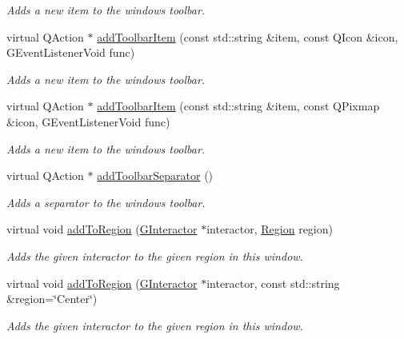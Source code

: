 \begin{DoxyCompactItemize}
\begin{DoxyCompactList}\small\item\em Adds a new item to the window\textquotesingle{}s toolbar. \end{DoxyCompactList}\item 
virtual Q\+Action $\ast$ \mbox{\hyperlink{classGWindow_a1cd26d8c9004f7cbd81cecfbd323f418}{add\+Toolbar\+Item}} (const std\+::string \&item, const Q\+Icon \&icon, G\+Event\+Listener\+Void func)
\begin{DoxyCompactList}\small\item\em Adds a new item to the window\textquotesingle{}s toolbar. \end{DoxyCompactList}\item 
virtual Q\+Action $\ast$ \mbox{\hyperlink{classGWindow_a6daacc5873dd3a11813a68fcf88c9d6e}{add\+Toolbar\+Item}} (const std\+::string \&item, const Q\+Pixmap \&icon, G\+Event\+Listener\+Void func)
\begin{DoxyCompactList}\small\item\em Adds a new item to the window\textquotesingle{}s toolbar. \end{DoxyCompactList}\item 
virtual Q\+Action $\ast$ \mbox{\hyperlink{classGWindow_a885470a4fc1b578a76f6fddc2b1950a2}{add\+Toolbar\+Separator}} ()
\begin{DoxyCompactList}\small\item\em Adds a separator to the window\textquotesingle{}s toolbar. \end{DoxyCompactList}\item 
virtual void \mbox{\hyperlink{classGWindow_aab55413917cdbb2e0560ab415d59fd1f}{add\+To\+Region}} (\mbox{\hyperlink{classGInteractor}{G\+Interactor}} $\ast$interactor, \mbox{\hyperlink{classGWindow_a81a01a86de31071a92e6cce0bab9bc4b}{Region}} region)
\begin{DoxyCompactList}\small\item\em Adds the given interactor to the given region in this window. \end{DoxyCompactList}\item 
virtual void \mbox{\hyperlink{classGWindow_a9c8e600889001e6e72d3548918a6baff}{add\+To\+Region}} (\mbox{\hyperlink{classGInteractor}{G\+Interactor}} $\ast$interactor, const std\+::string \&region=\char`\"{}Center\char`\"{})
\begin{DoxyCompactList}\small\item\em Adds the given interactor to the given region in this window. \end{DoxyCompactList}\item 

\end{DoxyCompactItemize}
